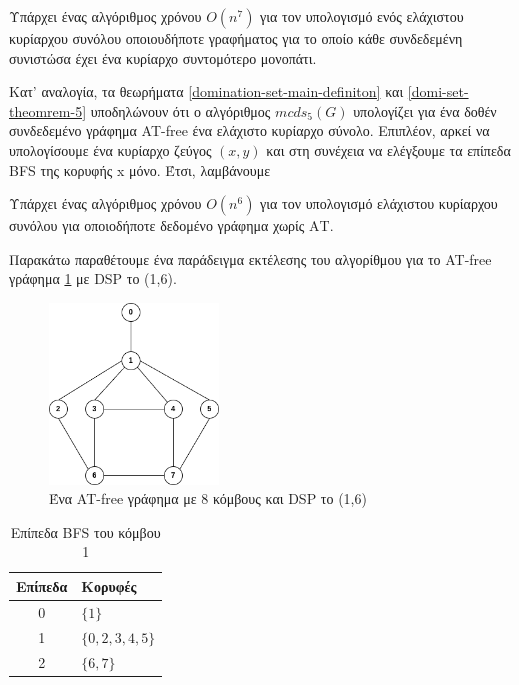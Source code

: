 \begin{theorem}
	\label{domi-set-theomrem-5}
	Υπάρχει ένας αλγόριθμος χρόνου $O(n^7)$ για τον υπολογισμό ενός ελάχιστου κυρίαρχου συνόλου οποιουδήποτε γραφήματος για το οποίο κάθε συνδεδεμένη συνιστώσα έχει ένα κυρίαρχο συντομότερο μονοπάτι.
\end{theorem}
Κατ' αναλογία, τα θεωρήματα \ref{domination-set-main-definiton} και \ref{domi-set-theomrem-5} υποδηλώνουν ότι ο αλγόριθμος $mcds_5(G)$ υπολογίζει για ένα δοθέν
συνδεδεμένο γράφημα AT-free ένα ελάχιστο κυρίαρχο σύνολο. Επιπλέον, αρκεί να υπολογίσουμε ένα κυρίαρχο ζεύγος $(x,y)$ και στη συνέχεια να ελέγξουμε τα επίπεδα BFS
της κορυφής x μόνο. Έτσι, λαμβάνουμε

\begin{theorem}
	Υπάρχει ένας αλγόριθμος χρόνου $O(n^6)$ για τον υπολογισμό ελάχιστου
	κυρίαρχου συνόλου για οποιοδήποτε δεδομένο γράφημα χωρίς ΑΤ.
\end{theorem}

Παρακάτω παραθέτουμε ένα παράδειγμα εκτέλεσης του αλγορίθμου για το AT-free γράφημα \ref{fig:at-free-graph-example-domi} με DSP το (1,6).

\begin{figure}[H]
	\centering
	\includegraphics[width=0.4\textwidth]{pictures/at-free-graph.png} 
	\caption{Ένα AT-free γράφημα με 8 κόμβους και DSP το (1,6)}
	\label{fig:at-free-graph-example-domi}
\end{figure}


\begin{table}[H]
	\centering
	\caption{Επίπεδα BFS του κόμβου 1}
	\label{tab:bfs_levels}
	\begin{tabular}{|c|l|}
		\hline
		\textbf{Επίπεδα} & \textbf{Κορυφές} \\
		\hline
		0 & $\{1\}$ \\
		1 & $\{0, 2, 3, 4, 5\}$ \\
		2 & $\{6, 7\}$ \\
		\hline
	\end{tabular}
\end{table}

